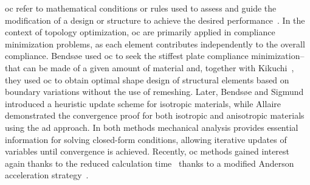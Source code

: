 \gls{oc} refer to mathematical conditions or rules used to assess and guide the modification of a design or structure to achieve the desired performance~. In the context of topology optimization, \gls{oc} are primarily applied in compliance minimization problems, as each element contributes independently to the overall compliance. Bendsøe used \gls{oc} to seek the stiffest plate \ie compliance minimization--that can be made of a given amount of material and, together with Kikuchi~, they used \gls{oc} to obtain optimal shape design of structural elements based on boundary variations without the use of remeshing. Later, Bendsøe and Sigmund~ introduced a heuristic update scheme for isotropic materials, while Allaire \etal~ demonstrated the convergence proof for both isotropic and anisotropic materials using the \gls{ad} approach. In both methods mechanical analysis provides essential information for solving closed-form conditions, allowing iterative updates of variables until convergence is achieved. Recently, \gls{oc} methods gained interest again thanks to the reduced calculation time~ thanks to a modified Anderson acceleration strategy~.

